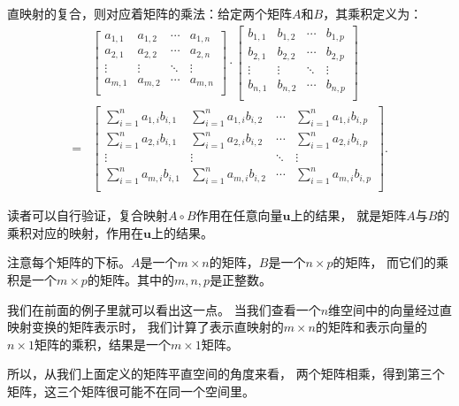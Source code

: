 \documentclass[12pt,UTF8]{ctexbook}
\begin{document}
直映射的复合，则对应着矩阵的乘法：给定两个矩阵$A$和$B$，其乘积定义为：
\begin{align*}
& \begin{bmatrix}
    a_{1,1}    & a_{1,2}   & \cdots & a_{1,n} \\
    a_{2,1}    & a_{2,2}   & \cdots & a_{2,n} \\
    \vdots     & \vdots    & \ddots & \vdots  \\
    a_{m,1}    & a_{m,2}   & \cdots & a_{m,n} \\
   \end{bmatrix} \cdot 
   \begin{bmatrix}
    b_{1,1}     & b_{1,2}   & \cdots & b_{1,p} \\
    b_{2,1}     & b_{2,2}   & \cdots & b_{2,p} \\
    \vdots      & \vdots    & \ddots & \vdots  \\
    b_{n,1}     & b_{n,2}   & \cdots & b_{n,p} \\
\end{bmatrix}  \\
    =&\begin{bmatrix}
        \sum_{i=1}^n a_{1,i} b_{i,1}     & \sum_{i=1}^n a_{1,i} b_{i,2}   & \cdots & \sum_{i=1}^n a_{1,i} b_{i,p} \\
        \sum_{i=1}^n a_{2,i} b_{i,1}     & \sum_{i=1}^n a_{2,i} b_{i,2}   & \cdots & \sum_{i=1}^n a_{2,i} b_{i,p} \\
        \vdots      & \vdots    & \ddots & \vdots  \\
        \sum_{i=1}^n a_{m,i} b_{i,1}     & \sum_{i=1}^n a_{m,i} b_{i,2}   & \cdots & \sum_{i=1}^n a_{m,i} b_{i,p} \\
    \end{bmatrix}. 
\end{align*}

读者可以自行验证，复合映射$A\circ B$作用在任意向量$\mathbf{u}$上的结果，
就是矩阵$A$与$B$的乘积对应的映射，作用在$\mathbf{u}$上的结果。

注意每个矩阵的下标。$A$是一个$m\times n$的矩阵，$B$是一个$n\times p$的矩阵，
而它们的乘积是一个$m\times p$的矩阵。其中的$m,n,p$是正整数。

我们在前面的例子里就可以看出这一点。
当我们查看一个$n$维空间中的向量经过直映射变换的矩阵表示时，
我们计算了表示直映射的$m\times n$的矩阵和表示向量的$n\times 1$矩阵的乘积，结果是一个$m\times 1$矩阵。

所以，从我们上面定义的矩阵平直空间的角度来看，
两个矩阵相乘，得到第三个矩阵，这三个矩阵很可能不在同一个空间里。
\end{document}
